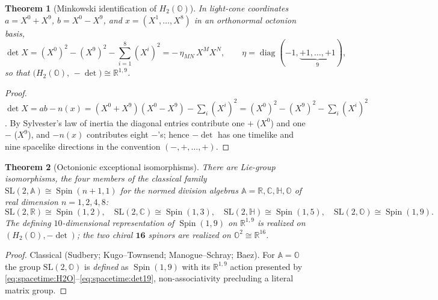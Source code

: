 \documentclass[11pt]{article}
\theoremstyle{plain}
\newtheorem{theorem}{Theorem}[section]
\theoremstyle{definition}
\theoremstyle{remark}
\newcommand{\SL}{\mathrm{SL}}
\newcommand{\Spin}{\operatorname{Spin}}
\newcommand{\diag}{\operatorname{diag}}
\begin{document}
\begin{theorem}[Minkowski identification of $H_2(\mathbb O)$]
\label{thm:spacetime:minkowski}
In light-cone coordinates $a=X^0+X^9$, $b=X^0-X^9$, and $x=(X^1,\dots,X^8)$ in an
orthonormal octonion basis,
\begin{equation}\label{eq:spacetime:det19}
  \det X = (X^0)^2-(X^9)^2-\sum_{i=1}^{8}(X^i)^2 = -\,\eta_{MN}\,X^M X^N,\qquad
  \eta=\diag(-1,\underbrace{+1,\dots,+1}_{9}),
\end{equation}
so that $\bigl(H_2(\mathbb O),\,-\det\bigr)\cong\mathbb R^{1,9}$.
\end{theorem}
\begin{proof}
$\det X = ab-n(x)=(X^0+X^9)(X^0-X^9)-\sum_i(X^i)^2=(X^0)^2-(X^9)^2-\sum_i(X^i)^2$.
By Sylvester's law of inertia the diagonal entries contribute one $+$ ($X^0$) and one
$-$ ($X^9$), and $-n(x)$ contributes eight $-$'s; hence $-\det$ has one timelike and
nine spacelike directions in the convention $(-,+,\dots,+)$.
\end{proof}

\begin{theorem}[Octonionic exceptional isomorphisms]
\label{thm:spacetime:exc}
There are Lie-group isomorphisms, the four members of the classical family
$\SL(2,\mathbb A)\cong\Spin(n{+}1,1)$ for the normed division algebras
$\mathbb A=\mathbb R,\mathbb C,\mathbb H,\mathbb O$ of real dimension $n=1,2,4,8$:
\begin{equation}\label{eq:spacetime:sl2}
  \SL(2,\mathbb R)\cong\Spin(1,2),\quad
  \SL(2,\mathbb C)\cong\Spin(1,3),\quad
  \SL(2,\mathbb H)\cong\Spin(1,5),\quad
  \SL(2,\mathbb O)\cong\Spin(1,9).
\end{equation}
The defining $10$-dimensional representation of $\Spin(1,9)$ on $\mathbb R^{1,9}$ is
realized on $(H_2(\mathbb O),-\det)$; the two chiral $\mathbf{16}$ spinors are
realized on $\mathbb O^2\cong\mathbb R^{16}$.
\end{theorem}
\begin{proof}
Classical (Sudbery; Kugo--Townsend; Manogue--Schray; Baez). For $\mathbb A=\mathbb O$
the group $\SL(2,\mathbb O)$ is \emph{defined} as $\Spin(1,9)$ with its
$\mathbb R^{1,9}$ action presented by \eqref{eq:spacetime:H2O}--\eqref{eq:spacetime:det19},
non-associativity precluding a literal matrix group.
\end{proof}
\end{document}
